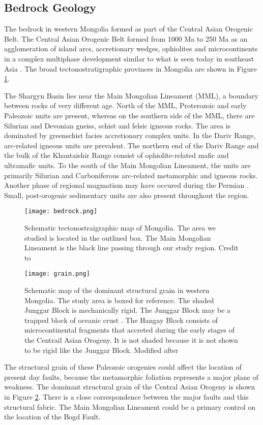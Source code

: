 \subsection{Bedrock Geology}
The bedrock in western Mongolia formed as part of the Central Asian Orogenic Belt. The Central Asian Orogenic Belt formed from 1000 Ma to 250 Ma as an agglomeration of island arcs, accretionary wedges, ophiolites and microcontinents in a complex multiphase development similar to what is seen today in southeast Asia \citep{Windley2007}. The broad tectonostratigraphic provinces in Mongolia are shown in Figure \ref{bedrock}.

The Shargyn Basin lies near the Main Mongolian Lineament (MML), a boundary between rocks of very different age. North of the MML, Proterozoic and early Paleozoic units are present, whereas on the southern side of the MML, there are Silurian and Devonian gneiss, schist and felsic igneous rocks. The area is dominated by greenschist facies accretionary complex units. In the Dariv Range, arc-related igneous units are prevalent. The northern end of the Dariv Range and the bulk of the Khantaishir Range consist of ophiolite-related mafic and ultramafic units. To the south of the Main Mongolian Lineament, the units are primarily Silurian and Carboniferous arc-related metamorphic and igneous rocks. Another phase of regional magmatism may have occured during the Permian \citep{Windley2007}. Small, post-orogenic sedimentary units are also present throughout the region.

\begin{figure}[h!]
  \centering
  \texttt{[image: bedrock.png]}
  \caption{Schematic tectonostraigraphic map of Mongolia. The area we studied is located in the outlined box. The Main Mongolian Lineament is the black line passing through our study region. Credit to \citet{Windley2007}}
  \label{bedrock}
\end{figure}

\begin{figure}[h!]
  \centering
  \texttt{[image: grain.png]}
  \caption{Schematic map of the dominant structural grain in western Mongolia. The study area is boxed for reference. The shaded Junggar Block is mechanically rigid. The Junggar Block may be a trapped block of oceanic crust \citep{Carroll1990a}.  The Hangay Block consists of microcontinental fragments that accreted during the early stages of the Centrail Asian Orogeny. It is not shaded because it is not shown to be rigid like the Junggar Block.  Modified after \citet{Cunningham2005a}}
  \label{grain}
\end{figure}

The structural grain of these Paleozoic orogenies could affect the location of present day faults, because the metamorphic foliation represents a major plane of weakness. The dominant structural grain of the Central Asian Orogeny is shown in Figure \ref{grain}. There is a close correspondence between the major faults and this structural fabric. The Main Mongolian Lineament could be a primary control on the location of the Bogd Fault.

\clearpage

